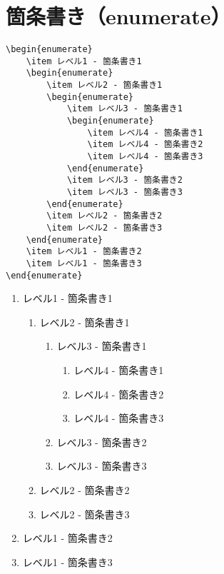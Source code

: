 \section{箇条書き（enumerate）}

\begin{verbatim}
\begin{enumerate}
    \item レベル1 - 箇条書き1
    \begin{enumerate}
        \item レベル2 - 箇条書き1
        \begin{enumerate}
            \item レベル3 - 箇条書き1
            \begin{enumerate}
                \item レベル4 - 箇条書き1
                \item レベル4 - 箇条書き2
                \item レベル4 - 箇条書き3
            \end{enumerate}
            \item レベル3 - 箇条書き2
            \item レベル3 - 箇条書き3
        \end{enumerate}
        \item レベル2 - 箇条書き2
        \item レベル2 - 箇条書き3
    \end{enumerate}
    \item レベル1 - 箇条書き2
    \item レベル1 - 箇条書き3
\end{enumerate}
\end{verbatim}

\begin{enumerate}
  \item レベル1 - 箇条書き1
    \begin{enumerate}
      \item レベル2 - 箇条書き1
        \begin{enumerate}
          \item レベル3 - 箇条書き1
            \begin{enumerate}
              \item レベル4 - 箇条書き1
              \item レベル4 - 箇条書き2
              \item レベル4 - 箇条書き3
            \end{enumerate}
          \item レベル3 - 箇条書き2
          \item レベル3 - 箇条書き3
        \end{enumerate}
      \item レベル2 - 箇条書き2
      \item レベル2 - 箇条書き3
    \end{enumerate}
  \item レベル1 - 箇条書き2
  \item レベル1 - 箇条書き3
\end{enumerate}
